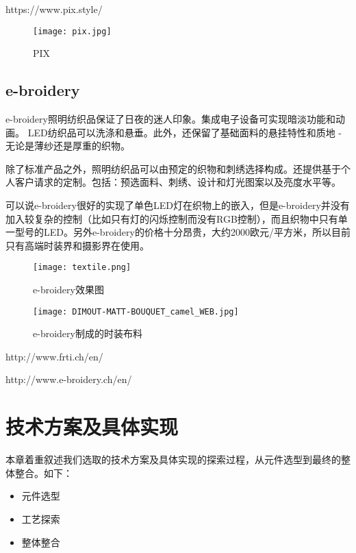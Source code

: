 https://www.pix.style/

\begin{figure}[htbp]
\centering
\texttt{[image: pix.jpg]}
\caption{PIX} 
\label{p1}
\end{figure}

\section{e-broidery}

e-broidery照明纺织品保证了日夜的迷人印象。集成电子设备可实现暗淡功能和动画。 LED纺织品可以洗涤和悬垂。此外，还保留了基础面料的悬挂特性和质地 - 无论是薄纱还是厚重的织物。

除了标准产品之外，照明纺织品可以由预定的织物和刺绣选择构成。还提供基于个人客户请求的定制。包括：预选面料、刺绣、设计和灯光图案以及亮度水平等。

可以说e-broidery很好的实现了单色LED灯在织物上的嵌入，但是e-broidery并没有加入较复杂的控制（比如只有灯的闪烁控制而没有RGB控制），而且织物中只有单一型号的LED。另外e-broidery的价格十分昂贵，大约2000欧元/平方米，所以目前只有高端时装界和摄影界在使用。


\begin{figure}[htbp]
\centering
\texttt{[image: textile.png]}
\caption{e-broidery效果图} 
\label{e1}
\end{figure}

\begin{figure}[htbp]
\centering
\texttt{[image: DIMOUT-MATT-BOUQUET\_camel\_WEB.jpg]}
\caption{e-broidery制成的时装布料} 
\label{e2}
\end{figure}

http://www.frti.ch/en/

http://www.e-broidery.ch/en/





\chapter{技术方案及具体实现}

本章着重叙述我们选取的技术方案及具体实现的探索过程，从元件选型到最终的整体整合。如下：

\begin{itemize}
\item 元件选型
\item 工艺探索
\item  整体整合
\end{itemize}

